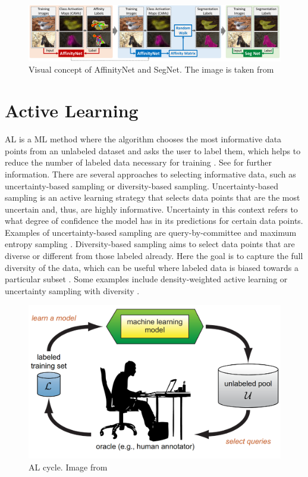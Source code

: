 \begin{figure}[H]%
    \centering
    \includegraphics[width=\imgWidthXL]{images/weakly_affinity.png}
    \caption[AffinityNet]{Visual concept of AffinityNet and SegNet. The image is taken from \cite{Ahn_2018_CVPR}}
    \label{weakly_affinity}
\end{figure}

\section{Active Learning}
\ac{AL} is a \ac{ML} method where the algorithm chooses the most informative data points from an unlabeled dataset and asks the user to label them, which helps to reduce the number of labeled data necessary for training \cite{settles2009active}. See  for further information. There are several approaches to selecting informative data, such as uncertainty-based sampling \cite{sharma2017evidence} or diversity-based \cite{4036653} sampling. Uncertainty-based sampling is an active learning strategy that selects data points that are the most uncertain and, thus, are highly informative. Uncertainty in this context refers to what degree of confidence the model has in its predictions for certain data points. Examples of uncertainty-based sampling are query-by-committee \cite{kee2018query} and maximum entropy sampling \cite{mayer2020adversarial}. Diversity-based sampling aims to select data points that are diverse or different from those labeled already. Here the goal is to capture the full diversity of the data, which can be useful where labeled data is biased towards a particular subset \cite{agarwal2020contextual}. Some examples include density-weighted active learning \cite{donmez2007dual} or uncertainty sampling with diversity \cite{wang2017uncertainty}.

\begin{figure}[H]%
    \centering
    \includegraphics[width=\imgWidthM]{images/active_learning_cycle.png}
    \caption[\acf{AL} cycle]{\acf{AL} cycle. Image from \cite{settles2009active}}
    \label{active_learning_cycle}
\end{figure}

